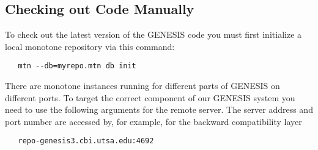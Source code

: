 \documentclass[12pt]{article}
\begin{document}
\subsection*{Checking out Code Manually}

To check out the latest version of the GENESIS code you must first initialize a local monotone repository via this command:
\begin{verbatim}
   mtn --db=myrepo.mtn db init 
\end{verbatim}
There are monotone instances running for different parts of GENESIS on different ports. To target the correct component of our GENESIS system you need to use the following arguments for the remote server. The server address and port number are accessed by, for example, for the backward compatibility layer
\begin{verbatim}
   repo-genesis3.cbi.utsa.edu:4692
\end{verbatim}
\end{document}
